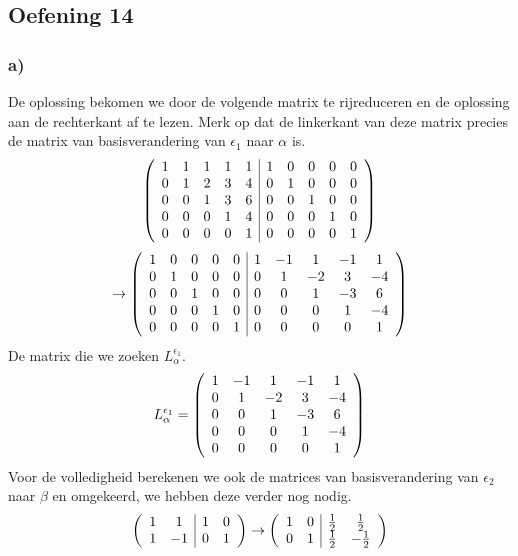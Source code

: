 \documentclass[lineaire_algebra_oplossingen.tex]{subfiles}
\begin{document}
\subsection{Oefening 14}
\subsubsection*{a)}
De oplossing bekomen we door de volgende matrix te rijreduceren en de oplossing aan de rechterkant af te lezen. Merk op dat de linkerkant van deze matrix precies de matrix van basisverandering van $\epsilon_{1}$ naar $\alpha$ is.
\[
\left(
\begin{array}{c c c c c | c c c c c}
1 & 1 & 1 & 1 & 1 & 1 & 0 & 0 & 0 & 0\\ 
0 & 1 & 2 & 3 & 4 & 0 & 1 & 0 & 0 & 0\\ 
0 & 0 & 1 & 3 & 6 & 0 & 0 & 1 & 0 & 0\\ 
0 & 0 & 0 & 1 & 4 & 0 & 0 & 0 & 1 & 0\\ 
0 & 0 & 0 & 0 & 1 & 0 & 0 & 0 & 0 & 1\\ 
\end{array}
\right)
\]
\[
\rightarrow
\left(
\begin{array}{c c c c c | c c c c c}
1 & 0 & 0 & 0 & 0 & 1 & -1 & 1 & -1 & 1 \\ 
0 & 1 & 0 & 0 & 0 & 0 & 1 & -2 & 3 & -4\\ 
0 & 0 & 1 & 0 & 0 & 0 & 0 & 1 & -3 & 6\\ 
0 & 0 & 0 & 1 & 0 & 0 & 0 & 0 & 1 & -4\\ 
0 & 0 & 0 & 0 & 1 & 0 & 0 & 0 & 0 & 1\\ 
\end{array}
\right)
\]
De matrix die we zoeken $L_\alpha^{\epsilon_{1}}$.
\[
L_\alpha^{\epsilon_{1}}
=
\left(
\begin{array}{c c c c c}
1 & -1 & 1 & -1 & 1 \\ 
0 & 1 & -2 & 3 & -4\\ 
0 & 0 & 1 & -3 & 6\\ 
0 & 0 & 0 & 1 & -4\\ 
0 & 0 & 0 & 0 & 1\\ 
\end{array}
\right)
\]
Voor de volledigheid berekenen we ook de matrices van basisverandering van $\epsilon_{2}$ naar $\beta$ en omgekeerd, we hebben deze verder nog nodig.
\[
\left(
\begin{array}{c c | c c}
1 & 1 & 1 & 0\\ 
1 & -1 & 0 & 1\\ 
\end{array}
\right)
\rightarrow
\left(
\begin{array}{c c | c c}
1 & 0 & \frac{1}{2} & \frac{1}{2}\\ 
0 & 1 & \frac{1}{2} & -\frac{1}{2}\\ 
\end{array}
\right)
\]
\end{document}
